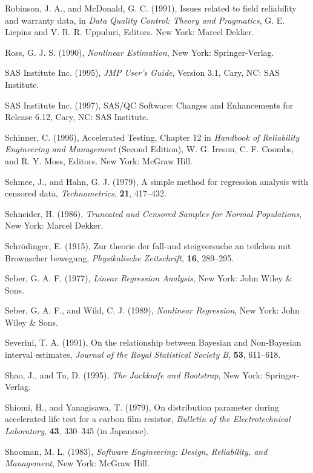 \begin{thebibliography}{999}
Robinson, J. A., and McDonald, G. C. (1991), Issues related to field
reliability and warranty data, in {\em Data Quality Control: Theory
and Pragmatics}, G. E. Liepins and V. R. R. Uppuluri, Editors. New York:
Marcel Dekker.

Ross, G. J. S. (1990), {\em Nonlinear Estimation}, New York:
Springer-Verlag.
 
SAS Institute Inc. (1995), {\em JMP User's Guide}, Version 3.1, 
Cary, NC: SAS Institute.

SAS Institute Inc. (1997), SAS/QC Software: Changes and Enhancements 
for Release 6.12, Cary, NC: SAS Institute.

Schinner, C. (1996), Accelerated Testing, Chapter 12 in
{\em Handbook of Reliability Engineering and Management} (Second
Edition), W. G. Ireson, C. F. Coombs, and R. Y.  Moss, Editors.  New
York: McGraw Hill.

Schmee, J., and Hahn, G. J. (1979), A simple method for regression
analysis with censored data, {\em Technometrics}, {\bf 21}, 417--432.

Schneider, H. (1986),
{\em Truncated and Censored Samples for Normal Populations},
New York: Marcel Dekker.

Schr\"odinger, E. (1915), Zur theorie der fall-und steigversuche an
teilchen mit Brownscher bewegung, {\em Physikalische Zeitschrift},
{\bf 16}, 289--295.

Seber, G. A. F. (1977), {\em Linear Regression Analysis}, New York:
John Wiley \& Sons.

Seber, G. A. F., and Wild, C. J. (1989), {\em Nonlinear Regression},
New York: John Wiley \& Sons.

Severini, T. A. (1991), On the relationship between Bayesian and
Non-Bayesian interval estimates, {\em Journal of the Royal Statistical
Society B}, {\bf 53}, 611--618.

Shao, J., and Tu, D. (1995), {\em The Jackknife and Bootstrap}, New
York: Springer-Verlag.

Shiomi, H., and Yanagisawa, T. (1979), On distribution parameter
during accelerated life test for a carbon film resistor, {\em
Bulletin of the Electrotechnical Laboratory}, {\bf 43}, 330--345
(in Japanese).

Shooman, M. L. (1983), {\em Software Engineering: Design, Reliability,
and Management}, New York: McGraw Hill.


\end{thebibliography}
